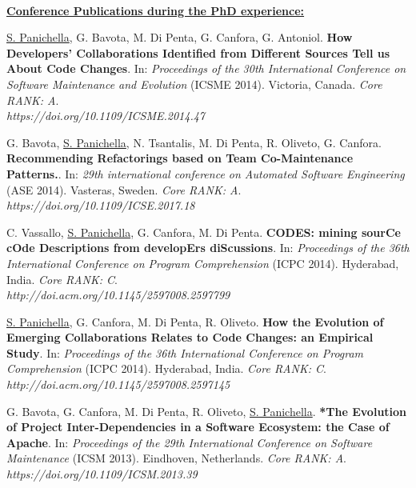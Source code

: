 \documentclass[10pt]{article}
\begin{document}
\textbf{\\\underline{Conference Publications during the PhD experience:}}\\
\begin{bibenum}
    \item  \label{C17}  \underline{S. Panichella}, G. Bavota, M. Di Penta, G. Canfora, G. Antoniol. \textbf{How Developers' Collaborations Identified from Different Sources Tell us About Code Changes}. In: \emph{Proceedings of the 30th International Conference on Software Maintenance and Evolution} (ICSME 2014). Victoria, Canada.  \textit{Core RANK: A}. \\\textit{https://doi.org/10.1109/ICSME.2014.47}

    \item  \label{C18}  G. Bavota, \underline{S. Panichella}, N. Tsantalis, M. Di Penta, R. Oliveto, G. Canfora. \textbf{Recommending Refactorings based on Team Co-Maintenance Patterns.}. In: \emph{29th international conference on Automated Software Engineering} (ASE 2014). Vasteras, Sweden.  \textit{Core RANK: A}.
    \\\textit{https://doi.org/10.1109/ICSE.2017.18}

    \item  \label{C19}  C. Vassallo, \underline{S. Panichella}, G. Canfora, M. Di Penta. \textbf{CODES: mining sourCe cOde Descriptions from developErs diScussions}. In: \emph{Proceedings of the 36th International Conference on Program Comprehension} (ICPC 2014). Hyderabad, India.  \textit{Core RANK: C}. \\\textit{http://doi.acm.org/10.1145/2597008.2597799}

    \item  \label{C20}  \underline{S. Panichella}, G. Canfora, M. Di Penta, R. Oliveto. \textbf{How the Evolution of Emerging Collaborations Relates to Code Changes: an Empirical Study}. In: \emph{Proceedings of the 36th International Conference on Program Comprehension} (ICPC 2014). Hyderabad, India.  \textit{Core RANK: C}.
    \\\textit{http://doi.acm.org/10.1145/2597008.2597145}

    \item  \label{C21}  G. Bavota, G. Canfora, M. Di Penta, R. Oliveto, \underline{S. Panichella}. \textbf{*The Evolution of Project Inter-Dependencies in a Software Ecosystem: the Case of Apache}. In: \emph{Proceedings of the 29th International Conference on Software Maintenance} (ICSM 2013). Eindhoven, Netherlands.  \textit{Core RANK: A}.
\\\textit{https://doi.org/10.1109/ICSM.2013.39}


\end{bibenum}
\end{document}

